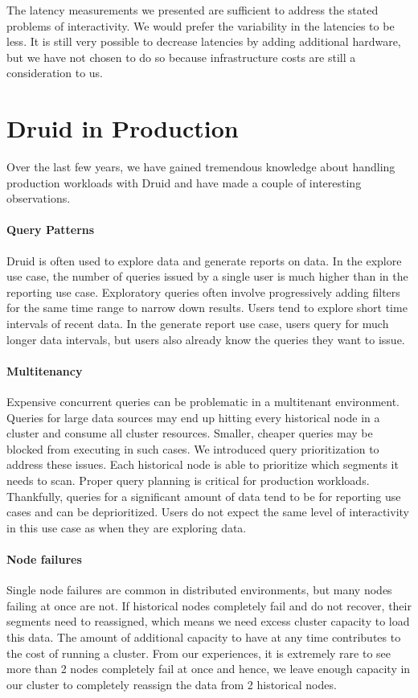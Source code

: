\documentclass{sig-alternate-2013}
\begin{document}
The latency measurements we presented are sufficient to address the stated
problems of interactivity. We would prefer the variability in the latencies to
be less. It is still very possible to decrease latencies by adding
additional hardware, but we have not chosen to do so because infrastructure
costs are still a consideration to us.

\section{Druid in Production}\label{sec:production}
Over the last few years, we have gained tremendous knowledge about handling
production workloads with Druid and have made a couple of interesting observations.

\paragraph{Query Patterns}
Druid is often used to explore data and generate reports on data. In the
explore use case, the number of queries issued by a single user is much higher
than in the reporting use case. Exploratory queries often involve progressively
adding filters for the same time range to narrow down results. Users tend to
explore short time intervals of recent data. In the generate report use case,
users query for much longer data intervals, but users also already know the
queries they want to issue.

\paragraph{Multitenancy}
Expensive concurrent queries can be problematic in a multitenant
environment. Queries for large data sources may end up hitting every historical
node in a cluster and consume all cluster resources. Smaller, cheaper queries
may be blocked from executing in such cases. We introduced query prioritization
to address these issues. Each historical node is able to prioritize which
segments it needs to scan. Proper query planning is critical for production
workloads. Thankfully, queries for a significant amount of data tend to be for
reporting use cases and can be deprioritized. Users do not expect the same level of
interactivity in this use case as when they are exploring data. 

\paragraph{Node failures}
Single node failures are common in distributed environments, but many nodes
failing at once are not. If historical nodes completely fail and do not
recover, their segments need to reassigned, which means we need excess cluster
capacity to load this data. The amount of additional capacity to have at any
time contributes to the cost of running a cluster. From our experiences, it is
extremely rare to see more than 2 nodes completely fail at once and hence, we
leave enough capacity in our cluster to completely reassign the data from 2
historical nodes. 
\end{document}
